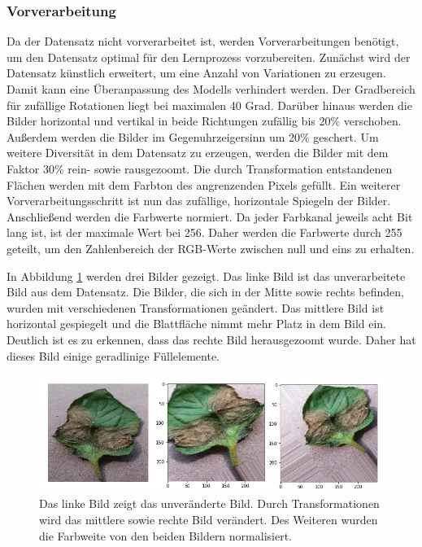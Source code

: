 \subsubsection{Vorverarbeitung}


Da der Datensatz nicht vorverarbeitet ist, werden Vorverarbeitungen benötigt, um den Datensatz optimal für den Lernprozess vorzubereiten. Zunächst wird der Datensatz künstlich erweitert, um eine Anzahl von Variationen zu erzeugen. Damit kann eine Überanpassung des Modells verhindert werden. Der Gradbereich für zufällige Rotationen liegt bei maximalen 40 Grad. Darüber hinaus werden die Bilder horizontal und vertikal in beide Richtungen zufällig bis 20\% verschoben. Außerdem werden die Bilder im Gegenuhrzeigersinn um 20\% geschert. Um weitere Diversität in dem Datensatz zu erzeugen, werden die Bilder mit dem Faktor 30\% rein- sowie rausgezoomt. Die durch Transformation entstandenen Flächen werden mit dem Farbton des angrenzenden Pixels gefüllt. Ein weiterer Vorverarbeitungsschritt ist nun das zufällige, horizontale Spiegeln der Bilder. Anschließend werden die Farbwerte normiert. Da jeder Farbkanal jeweils acht Bit lang ist, ist der maximale Wert bei 256. Daher werden die Farbwerte durch 255 geteilt, um den Zahlenbereich der RGB-Werte zwischen null und eins zu erhalten. 

In Abbildung \ref{data_segm} werden drei Bilder gezeigt. Das linke Bild ist das unverarbeitete Bild aus dem Datensatz. Die Bilder, die sich in der Mitte sowie rechts befinden, wurden mit verschiedenen Transformationen geändert. Das mittlere Bild ist horizontal gespiegelt und die Blattfläche nimmt mehr Platz in dem Bild ein. Deutlich ist es zu erkennen, dass das rechte Bild herausgezoomt wurde. Daher hat dieses Bild einige geradlinige Füllelemente.  

\begin{figure}[h!]
	\centering
	\includegraphics[width=\textwidth]{bilder/data_segmentation.PNG}
	\caption{Das linke Bild zeigt das unveränderte Bild. Durch Transformationen wird das mittlere sowie rechte Bild verändert. Des Weiteren wurden die Farbweite von den beiden Bildern normalisiert.}
	\label{data_segm}
\end{figure}

